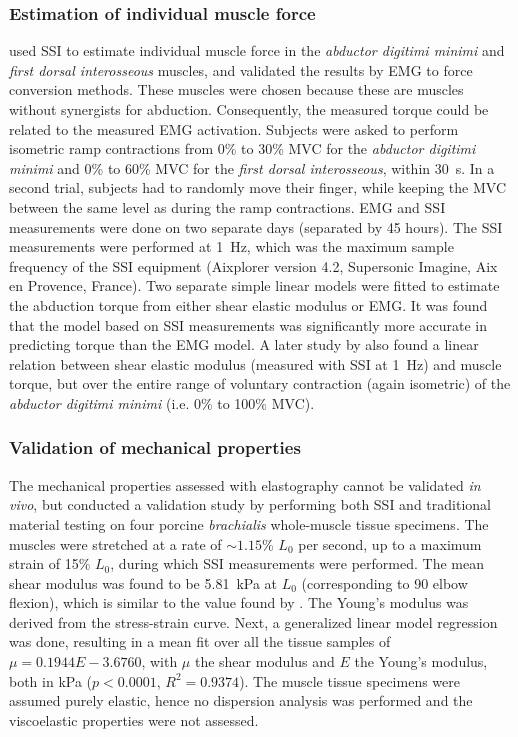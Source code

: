 \subsubsection{Estimation of individual muscle force}
\citet{bouillard_estimation_2011} used SSI to estimate individual muscle force in the \textit{abductor digitimi minimi} and \textit{first dorsal interosseous} muscles, and validated the results by EMG to force conversion methods. These muscles were chosen because these are muscles without synergists for abduction. Consequently, the measured torque could be related to the measured EMG activation. Subjects were asked to perform isometric ramp contractions from 0\% to 30\% MVC for the \textit{abductor digitimi minimi} and 0\% to 60\% MVC for the \textit{first dorsal interosseous}, within \SI{30}{\second}. In a second trial, subjects had to randomly move their finger, while keeping the MVC between the same level as during the ramp contractions. EMG and SSI measurements were done on two separate days (separated by 45 hours). The SSI measurements were performed at \SI{1}{\hertz}, which was the maximum sample frequency of the SSI equipment (Aixplorer version 4.2, Supersonic Imagine, Aix en Provence, France). Two separate simple linear models were fitted to estimate the abduction torque from either shear elastic modulus or EMG. It was found that the model based on SSI measurements was significantly more accurate in predicting torque than the EMG model. 
A later study by \citet{ates_muscle_2015} also found a linear relation between shear elastic modulus (measured with SSI at \SI{1}{\hertz}) and muscle torque, but over the entire range of voluntary contraction (again isometric) of the \textit{abductor digitimi minimi} (i.e. 0\% to 100\% MVC). 


\subsubsection{Validation of mechanical properties}
The mechanical properties assessed with elastography cannot be validated \textit{in vivo}, but \citet{eby_validation_2013} conducted a validation study by performing both SSI and traditional material testing on four porcine \textit{brachialis} whole-muscle tissue specimens. The muscles were stretched at a rate of $\sim{}1.15$\% $L_0$ per second, up to a maximum strain of 15\% $L_0$, during which SSI measurements were performed. The mean shear modulus was found to be \SI{5.81}{\kilo\pascal} at $L_0$ (corresponding to \SI{90}{\deg} elbow flexion), which is similar to the value found by \citet{gennisson_viscoelastic_2010}. The Young's modulus was derived from the stress-strain curve. Next, a generalized linear model regression was done, resulting in a mean fit over all the tissue samples of $\mu = 0.1944 E - 3.6760$, with $\mu$ the shear modulus and $E$ the Young's modulus, both in \si{\kilo\pascal} ($p<0.0001$, $R^2 = 0.9374$). The muscle tissue specimens were assumed purely elastic, hence no dispersion analysis was performed and the viscoelastic properties were not assessed.


